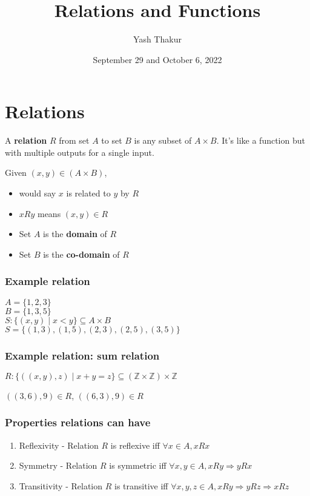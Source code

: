 \documentclass[12pt]{article}
\title{Relations and Functions}
\author{Yash Thakur}
\date{September 29 and October 6, 2022}
\newcommand{\set}[1]{\{#1\}}
\begin{document}
\maketitle

\section*{Relations}

A \textbf{relation} $R$ from set $A$ to set $B$ is any subset of $A \times B$. It's like a function but with multiple outputs for a single input.

Given $(x, y) \in (A \times B)$,
\begin{itemize}
    \item would say $x$ is related to $y$ by $R$
    \item $x R y$ means $(x, y) \in R$
    \item Set $A$ is the \textbf{domain} of $R$
    \item Set $B$ is the \textbf{co-domain} of $R$
\end{itemize}

\subsubsection*{Example relation}
$A = \set{1, 2, 3}$\\
$B = \set{1, 3, 5}$\\
$S\colon \set{(x, y) \mid x < y} \subseteq A \times B$\\
$S = \set{(1, 3), (1, 5), (2, 3), (2, 5), (3, 5)}$

\subsubsection*{Example relation: sum relation}
$R\colon \set{((x, y), z) \mid x + y = z} \subseteq (\mathbb Z \times \mathbb Z) \times \mathbb Z$

$((3, 6), 9) \in R$, $((6, 3), 9) \in R$

\subsubsection*{Properties relations can have}
\begin{enumerate}
    \item Reflexivity - Relation $R$ is reflexive iff $\forall x \in A, x R x$
    \item Symmetry - Relation $R$ is symmetric iff $\forall x, y \in A, x R y \Rightarrow y R x$
    \item Transitivity - Relation $R$ is transitive iff $\forall x,y,z \in A, x R y \Rightarrow y R z \Rightarrow x R z$
\end{enumerate}
\end{document}
